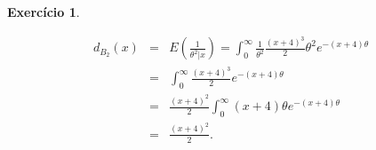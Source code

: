 \documentclass[letter,11pt]{article}
\newtheorem{exer}{Exercício}
\begin{document}
\begin{exer}
\begin{enumerate}[a)]
\begin{eqnarray}
d_{B_2}(x)&=&E(\frac{1}{\theta^2|x})=\int_{0}^{\infty}\frac{1}{\theta^2}\frac{(x+4)^3}{2}\theta^2
 e^{-(x+4)\theta}\\
 &=&\int_{0}^{\infty}\frac{(x+4)^3}{2}e^{-(x+4)\theta}\\
 &=& \frac{(x+4)^2}{2}\int_{0}^{\infty}(x+4)\theta e^{-(x+4)\theta}\\
 &=& \frac{(x+4)^2}{2}.
\end{eqnarray}
\end{enumerate}
\end{exer}
\end{document}
